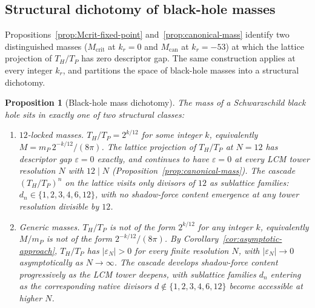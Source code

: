\documentclass[11pt,a4paper]{article}
\newtheorem{proposition}[theorem]{Proposition}
\theoremstyle{definition}
\theoremstyle{remark}
\begin{document}
\subsection{Structural dichotomy of black-hole masses}\label{subsec:BH-dichotomy}

Propositions~\ref{prop:Mcrit-fixed-point} and~\ref{prop:canonical-mass} identify two distinguished masses ($M_{\mathrm{crit}}$ at $k_{r}=0$ and $M_{\text{can}}$ at $k_{r}=-53$) at which the lattice projection of $T_{H}/T_{P}$ has zero descriptor gap. The same construction applies at every integer $k_{r}$, and partitions the space of black-hole masses into a structural dichotomy.

\begin{proposition}[Black-hole mass dichotomy]\label{prop:BH-dichotomy}
The mass of a Schwarzschild black hole sits in exactly one of two structural classes:
\begin{enumerate}[label=(\roman*),leftmargin=*]
\item \emph{$12$-locked masses.} $T_{H}/T_{P} = 2^{k/12}$ for some integer $k$, equivalently $M = m_{P}\,2^{-k/12}/(8\pi)$. The lattice projection of $T_{H}/T_{P}$ at $N=12$ has descriptor gap $\varepsilon = 0$ exactly, and continues to have $\varepsilon = 0$ at every LCM tower resolution $N$ with $12 \mid N$ (Proposition~\ref{prop:canonical-mass}). The cascade $(T_{H}/T_{P})^{n}$ on the lattice visits only divisors of $12$ as sublattice families: $d_{n} \in \{1,2,3,4,6,12\}$, with no shadow-force content emergence at any tower resolution divisible by $12$.
\item \emph{Generic masses.} $T_{H}/T_{P}$ is not of the form $2^{k/12}$ for any integer $k$, equivalently $M/m_{P}$ is not of the form $2^{-k/12}/(8\pi)$. By Corollary~\ref{cor:asymptotic-approach}, $T_{H}/T_{P}$ has $|\varepsilon_{N}| > 0$ for every finite resolution $N$, with $|\varepsilon_{N}| \to 0$ asymptotically as $N \to \infty$. The cascade develops shadow-force content progressively as the LCM tower deepens, with sublattice families $d_{n}$ entering as the corresponding native divisors $d \notin \{1,2,3,4,6,12\}$ become accessible at higher $N$.
\end{enumerate}
\end{proposition}
\end{document}
